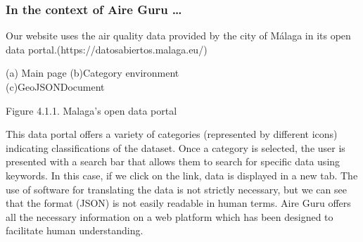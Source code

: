 \subsubsection*{In the context of Aire Guru \ldots} 

Our website uses the air quality data provided by the city of Málaga in its open data portal.(https://datosabiertos.malaga.eu/)\\

\begin{center}
    \bf{ (a) Main page     (b)Category environment\\
    (c)GeoJSONDocument
        
    Figure 4.1.1. Malaga's open data portal}
\end{center}

This data portal offers a variety of categories (represented by different icons) indicating classifications of the dataset.
Once a category is selected, the user is presented with a search bar that allows them to search for specific data using keywords.
In this case, if we click on the link, data is displayed in a new tab. The use of software
for translating the data is not strictly necessary, but we can see that the format (JSON) is not easily readable in human terms.
Aire Guru offers all the necessary information on a web platform which has been designed to facilitate human understanding. \\